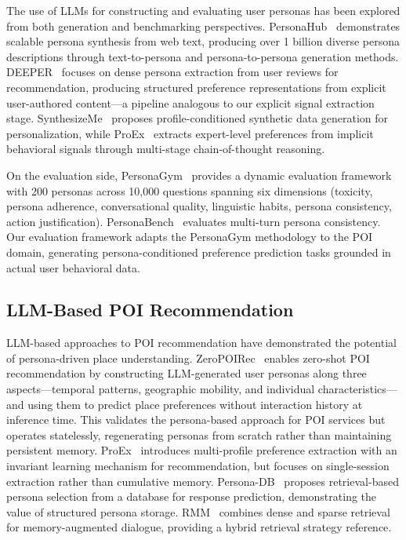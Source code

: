 \documentclass[manuscript,screen,review]{acmart}
\begin{document}
The use of LLMs for constructing and evaluating user personas has been explored from both generation and benchmarking perspectives.
PersonaHub~\cite{personahub} demonstrates scalable persona synthesis from web text, producing over 1 billion diverse persona descriptions through text-to-persona and persona-to-persona generation methods.
DEEPER~\cite{deeper} focuses on dense persona extraction from user reviews for recommendation, producing structured preference representations from explicit user-authored content---a pipeline analogous to our explicit signal extraction stage.
SynthesizeMe~\cite{synthesizeme} proposes profile-conditioned synthetic data generation for personalization, while ProEx~\cite{proex} extracts expert-level preferences from implicit behavioral signals through multi-stage chain-of-thought reasoning.

On the evaluation side, PersonaGym~\cite{personagym} provides a dynamic evaluation framework with 200 personas across 10,000 questions spanning six dimensions (toxicity, persona adherence, conversational quality, linguistic habits, persona consistency, action justification). PersonaBench~\cite{personabench} evaluates multi-turn persona consistency. Our evaluation framework adapts the PersonaGym methodology to the POI domain, generating persona-conditioned preference prediction tasks grounded in actual user behavioral data.

\subsection{LLM-Based POI Recommendation}

LLM-based approaches to POI recommendation have demonstrated the potential of persona-driven place understanding.
ZeroPOIRec~\cite{zeropoirec} enables zero-shot POI recommendation by constructing LLM-generated user personas along three aspects---temporal patterns, geographic mobility, and individual characteristics---and using them to predict place preferences without interaction history at inference time. This validates the persona-based approach for POI services but operates statelessly, regenerating personas from scratch rather than maintaining persistent memory.
ProEx~\cite{proex} introduces multi-profile preference extraction with an invariant learning mechanism for recommendation, but focuses on single-session extraction rather than cumulative memory.
Persona-DB~\cite{persona-db} proposes retrieval-based persona selection from a database for response prediction, demonstrating the value of structured persona storage.
RMM~\cite{rmm} combines dense and sparse retrieval for memory-augmented dialogue, providing a hybrid retrieval strategy reference.
\end{document}
